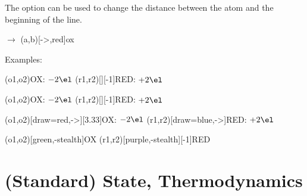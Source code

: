 \documentclass[load-preamble+]{cnltx-doc}
\begin{document}
\begin{options}
  \Default{.2em}
    The option can be used to change the distance between the atom and the
    beginning of the line.
\end{options}

\begin{example}
  \vspace{7mm}
   $\rightarrow$ \pch\redox(a,b)[->,red]{ox}
\end{example}

Examples:\nopagebreak%
\begin{example}
  \vspace{7mm}
  \redox(o1,o2){\small OX: $- 2\el$}
  \redox(r1,r2)[][-1]{\small RED: $+ 2\el$}
  \vspace{7mm}
\end{example}

\begin{example}
  \vspace{7mm}
  \redox(o1,o2){\small OX: $- 2\el$}
  \redox(r1,r2)[][-1]{\small RED: $+ 2\el$}
  \vspace{7mm}
\end{example}

\begin{example}
  \vspace{14mm}
  \redox(o1,o2)[draw=red,->][3.33]{\small OX: $- 2\el$}
  \redox(r1,r2)[draw=blue,->]{\small RED: $+ 2\el$}
\end{example}

\begin{example}
  \vspace{7mm}
  \redox(o1,o2)[green,-stealth]{\small OX}
  \redox(r1,r2)[purple,-stealth][-1]{\small RED}
  \vspace{7mm}
\end{example}

\section{(Standard) State, Thermodynamics}\label{sec:stand-state-therm}
\end{document}

